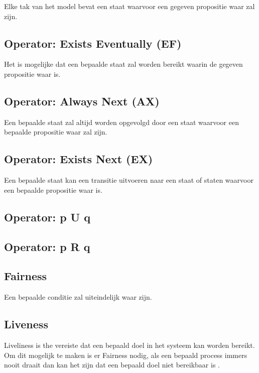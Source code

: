\documentclass{article}
\begin{document}
Elke tak van het model bevat een staat waarvoor een gegeven propositie waar zal zijn.

\subsection{Operator: Exists Eventually (EF)}

Het is mogelijke dat een bepaalde staat zal worden bereikt waarin de gegeven propositie waar is.

\subsection{Operator: Always Next (AX)}

Een bepaalde staat zal altijd worden opgevolgd door een staat waarvoor een bepaalde propositie waar zal zijn.

\subsection{Operator: Exists Next (EX)}

Een bepaalde staat kan een transitie uitvoeren naar een staat of staten waarvoor een bepaalde propositie waar is.

\subsection{Operator: p U q}

\subsection{Operator: p R q}

\subsection{Fairness}

Een bepaalde conditie zal uiteindelijk waar zijn.

\subsection{Liveness}

Liveliness is the vereiste dat een bepaald doel in het systeem kan worden bereikt. Om dit mogelijk te maken is er Fairness nodig, als een bepaald process immers nooit draait dan kan het zijn dat een bepaald doel niet bereikbaar is \cite{fairnessandliveness}.

\newpage
\end{document}
